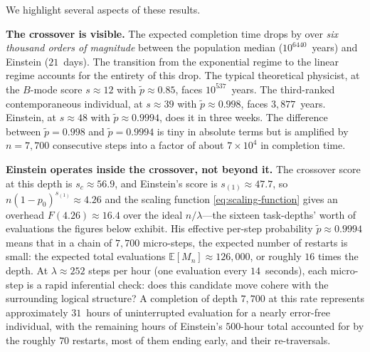 \documentclass{article}
\begin{document}
We highlight several aspects of these results.

\medskip
\noindent\textbf{The crossover is visible.}\;
The expected completion time drops by over \emph{six thousand
orders of magnitude} between the population median ($10^{6440}$~years)
and Einstein ($21$~days). The transition from the exponential regime
to the linear regime accounts for the entirety of this drop. The
typical theoretical physicist, at the $B$-mode score $s \approx 12$
with $\widetilde{p} \approx 0.85$, faces $10^{537}$~years. The
third-ranked contemporaneous individual, at $s \approx 39$ with
$\widetilde{p} \approx 0.998$, faces $3{,}877$~years. Einstein, at
$s \approx 48$ with $\widetilde{p} \approx 0.9994$, does it in three
weeks. The difference between $\widetilde{p} = 0.998$ and
$\widetilde{p} = 0.9994$ is tiny in absolute terms but is amplified by $n = 7{,}700$ consecutive steps into a factor of about $7 \times 10^4$ in completion time.

\medskip
\noindent\textbf{Einstein operates inside the crossover, not beyond it.}\; The crossover score at this depth is $s_c \approx 56.9$, and Einstein's score is $s_{(1)} \approx 47.7$, so $n(1-p_0)^{s_{(1)}} \approx 4.26$ and the scaling function \eqref{eq:scaling-function} gives an overhead $F(4.26) \approx 16.4$ over the ideal $n/\lambda$---the sixteen task-depths' worth of evaluations the figures below exhibit.
His effective per-step probability $\widetilde{p} \approx 0.9994$
means that in a chain of $7{,}700$ micro-steps, the expected number
of restarts is small: the expected total evaluations
$\mathbb{E}[M_n] \approx 126{,}000$, or roughly $16$ times the
depth. At $\lambda \approx 252$ steps per hour (one evaluation every
$14$~seconds), each micro-step is a rapid inferential check: does this
candidate move cohere with the surrounding logical structure? A
completion of depth $7{,}700$ at this rate represents approximately
$31$~hours of uninterrupted evaluation for a nearly error-free
individual, with the remaining hours of Einstein's $500$-hour total
accounted for by the roughly $70$ restarts, most of them ending early, and their re-traversals.
\end{document}
